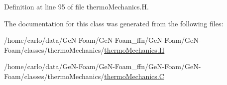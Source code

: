 Definition at line 95 of file thermo\+Mechanics.\+H.



The documentation for this class was generated from the following files\+:\begin{DoxyCompactItemize}
\item 
/home/carlo/data/\+Ge\+N-\/\+Foam/\+Ge\+N-\/\+Foam\+\_\+ffn/\+Ge\+N-\/\+Foam/\+Ge\+N-\/\+Foam/classes/thermo\+Mechanics/\hyperlink{thermoMechanics_8H}{thermo\+Mechanics.\+H}\item 
/home/carlo/data/\+Ge\+N-\/\+Foam/\+Ge\+N-\/\+Foam\+\_\+ffn/\+Ge\+N-\/\+Foam/\+Ge\+N-\/\+Foam/classes/thermo\+Mechanics/\hyperlink{thermoMechanics_8C}{thermo\+Mechanics.\+C}\end{DoxyCompactItemize}

